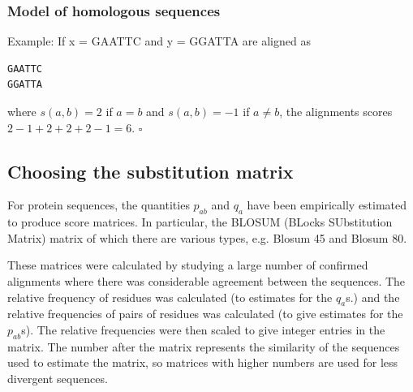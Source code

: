 \documentclass[11pt]{article}
\begin{document}
\subsubsection{Model  of homologous  sequences}


%
%
%
%

Example: If x = GAATTC and y =  GGATTA are aligned as 
\begin{verbatim} 
GAATTC
GGATTA
\end{verbatim}
where $s(a,b) = 2$  if $a = b$ and $s(a,b) = -1$ if $a \neq b$, the alignments scores $2-1+2+2+2-1 = 6$. \hfill $\square$



\subsection{Choosing the substitution matrix}

For protein sequences, the quantities $p_{ab}$ and $q_a$ have been empirically estimated to produce score matrices.  In particular, the  BLOSUM (BLocks SUbstitution Matrix) matrix of which there are various types, e.g. Blosum 45 and Blosum 80.

These matrices were calculated by studying a large number of confirmed alignments where there was considerable agreement between the sequences. The relative frequency of residues was calculated (to estimates for  the $q_a$s.) and the relative frequencies of pairs of residues was calculated  (to give estimates for  the $p_{ab}$s). The relative frequencies were then scaled to give integer entries in the matrix.  The number after the matrix represents the similarity of the sequences used to estimate the matrix, so matrices with higher numbers are used for less divergent sequences.  
\end{document}
